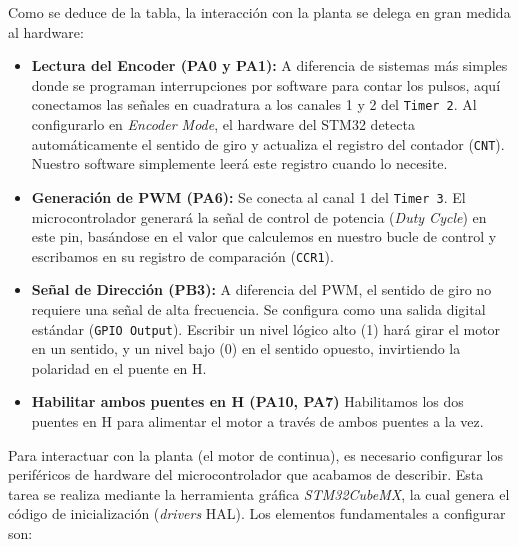 \documentclass[10pt,a4paper]{report}
\begin{document}
Como se deduce de la tabla, la interacción con la planta se delega en gran medida al hardware:
\begin{itemize}
	\item \textbf{Lectura del Encoder (PA0 y PA1):} A diferencia de sistemas más simples donde se programan interrupciones por software para contar los pulsos, aquí conectamos las señales en cuadratura a los canales 1 y 2 del \texttt{Timer 2}. Al configurarlo en \textit{Encoder Mode}, el hardware del STM32 detecta automáticamente el sentido de giro y actualiza el registro del contador (\texttt{CNT}). Nuestro software simplemente leerá este registro cuando lo necesite.
	
	\item \textbf{Generación de PWM (PA6):} Se conecta al canal 1 del \texttt{Timer 3}. El microcontrolador generará la señal de control de potencia (\textit{Duty Cycle}) en este pin, basándose en el valor que calculemos en nuestro bucle de control y escribamos en su registro de comparación (\texttt{CCR1}).
	
	\item \textbf{Señal de Dirección (PB3):} A diferencia del PWM, el sentido de giro no requiere una señal de alta frecuencia. Se configura como una salida digital estándar (\texttt{GPIO Output}). Escribir un nivel lógico alto (1) hará girar el motor en un sentido, y un nivel bajo (0) en el sentido opuesto, invirtiendo la polaridad en el puente en H.
	
	\item \textbf{Habilitar ambos puentes en H (PA10, PA7)} Habilitamos los dos puentes en H para alimentar el motor a través de ambos puentes a la vez. 
\end{itemize}

Para interactuar con la planta (el motor de continua), es necesario configurar los periféricos de hardware del microcontrolador que acabamos de describir. Esta tarea se realiza mediante la herramienta gráfica \textit{STM32CubeMX}, la cual genera el código de inicialización (\textit{drivers} HAL). Los elementos fundamentales a configurar son:
\end{document}
